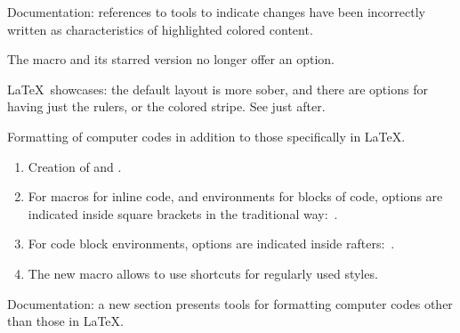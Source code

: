 \small

\begin{tdocfix}[version = 1.7.1, date = 2024-12-18]
	\item Documentation: references to tools to indicate changes have been incorrectly written as characteristics of highlighted colored content.
\end{tdocfix}


\begin{tdocbreak}
	\item The  macro and its starred version no longer offer an option.

	\item \LaTeX\ showcases: the default layout is more sober, and there are options for having just the rulers, or the colored stripe. See just after.
\end{tdocbreak}


\begin{tdocnew}
	\item Formatting of computer codes in addition to those specifically in \LaTeX.
	\begin{enumerate}
		\item Creation of  and .

		\item For macros for inline code, and environments for blocks of code,  options are indicated inside square brackets in the traditional way: \,.

		\item For code block environments,  options are indicated inside rafters: \,.

		\item The new macro  allows to use shortcuts for regularly used  styles.
	\end{enumerate}

	\item Documentation: a new section presents tools for formatting computer codes other than those in \LaTeX.
\end{tdocnew}


